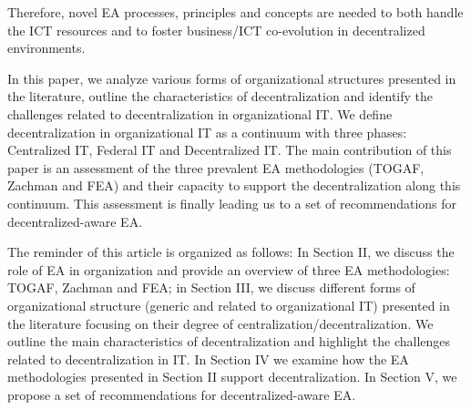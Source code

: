 


Therefore, novel EA processes, principles and concepts are needed to both handle the ICT resources and to foster business/ICT co-evolution in decentralized environments. 

 
In this paper, we analyze various forms of organizational structures presented in the literature,  outline the characteristics of decentralization and identify the challenges related to decentralization in organizational IT.  We define decentralization in organizational IT as a continuum with three phases: Centralized IT, Federal IT and Decentralized IT. The main contribution of this paper is an assessment of the three prevalent EA methodologies (TOGAF, Zachman and FEA) and their capacity to support the decentralization along this continuum. This assessment is finally leading us to a set of recommendations for decentralized-aware EA.


The reminder of this article is organized as follows: In Section II, we discuss the role of EA in organization and provide an overview of three EA methodologies: TOGAF, Zachman  and  FEA;  in  Section  III,  we  discuss different forms of organizational structure (generic and related to organizational IT) presented in the literature focusing on their degree of centralization/decentralization. We outline the main characteristics of decentralization and highlight the challenges related to decentralization in IT. In Section IV we examine how the EA methodologies presented in Section II support  decentralization.  In Section V, we propose a set of recommendations for decentralized-aware EA.

% 
% 
% 
% 
% 
% 
% 
% 
% 
% 
% 
% 
% 
% 
% 
% 
% 